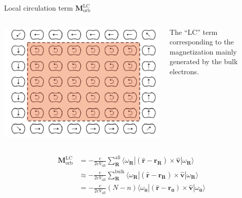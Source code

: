 \documentclass{beamer}
\begin{document}

    \begin{frame}[fragile,t]{Local circulation term \(\bm{M}_{\text{orb}}^{\text{LC}}\)}\scriptsize
      \begin{columns}
        \begin{column}{0.3\textwidth}
          \includegraphics[width=\textwidth]{figure/edge-solid2-bulk.png}
        \end{column}
        \begin{column}{0.5\textwidth}
          \begin{block}{}
            The ``LC'' term corresponding to the magnetization mainly generated by the bulk electrons.
          \end{block}
        \end{column}
      \end{columns}
      \begin{equation}\begin{aligned}
        \bm{M}_{\text{orb}}^{\text{LC}} &= -\frac{e}{2cV_{\text{all}}}\sum_{\bm{R}}^{\text{all}} \langle\omega_{\bm{R}}|\left(\widehat{\bm{r}}-\bm{r}_{\bm{R}}\right)\times\widehat{\bm{v}}|\omega_{\bm{R}}\rangle\\
        &\approx -\frac{e}{2cV_{\text{all}}}\sum_{\bm{R}}^{\text{bulk}} \langle\omega_{\bm{R}}|\left(\widehat{\bm{r}}-\bm{r}_{\bm{R}}\right)\times\widehat{\bm{v}}|\omega_{\bm{R}}\rangle\\
        &= -\frac{e}{2cV_{\text{all}}}(N-n)\langle\omega_{\bm{0}}|\left(\widehat{\bm{r}}-\bm{r}_{\bm{0}}\right)\times\widehat{\bm{v}}|\omega_{\bm{0}}\rangle\\

\end{aligned}
\end{equation}
\end{frame}
\end{document}
